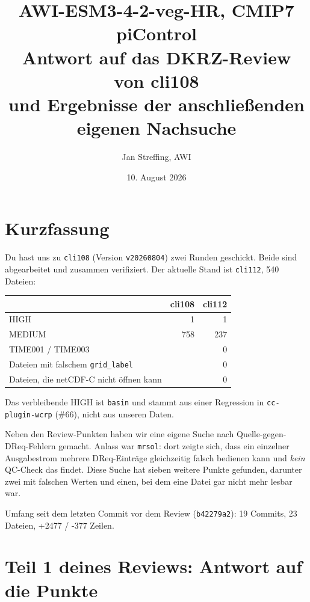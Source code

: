 \documentclass[11pt,a4paper]{article}
\title{AWI-ESM3-4-2-veg-HR, CMIP7 piControl\\[2mm]
\large Antwort auf das DKRZ-Review von cli108\\ und Ergebnisse der anschlie\ss enden eigenen Nachsuche}
\author{Jan Streffing, AWI}
\date{10. August 2026}
\newcommand{\code}[1]{\texttt{\small #1}}
\begin{document}
\maketitle

\section{Kurzfassung}

Du hast uns zu \code{cli108} (Version \code{v20260804}) zwei Runden geschickt.
Beide sind abgearbeitet und zusammen verifiziert. Der aktuelle Stand ist
\code{cli112}, 540 Dateien:

\begin{center}
\begin{tabular}{lrr}
\toprule
& \textbf{cli108} & \textbf{cli112} \\
\midrule
HIGH   & 1   & 1 \\
MEDIUM & 758 & 237 \\
TIME001 / TIME003 &  & 0 \\
Dateien mit falschem \code{grid\_label} &  & 0 \\
Dateien, die netCDF-C nicht \"offnen kann &  & 0 \\
\bottomrule
\end{tabular}
\end{center}

Das verbleibende HIGH ist \code{basin} und stammt aus einer Regression in
\code{cc-plugin-wcrp} (\#66), nicht aus unseren Daten.

Neben den Review-Punkten haben wir eine eigene Suche nach Quelle-gegen-DReq-Fehlern
gemacht. Anlass war \code{mrsol}: dort zeigte sich, dass ein einzelner Ausgabestrom
mehrere DReq-Eintr\"age gleichzeitig falsch bedienen kann und \emph{kein} QC-Check das
findet. Diese Suche hat sieben weitere Punkte gefunden, darunter zwei mit falschen
Werten und einen, bei dem eine Datei gar nicht mehr lesbar war.

Umfang seit dem letzten Commit vor dem Review (\code{b42279a2}): 19 Commits,
23 Dateien, +2477 / -377 Zeilen.

\section{Teil 1 deines Reviews: Antwort auf die Punkte}
\end{document}
